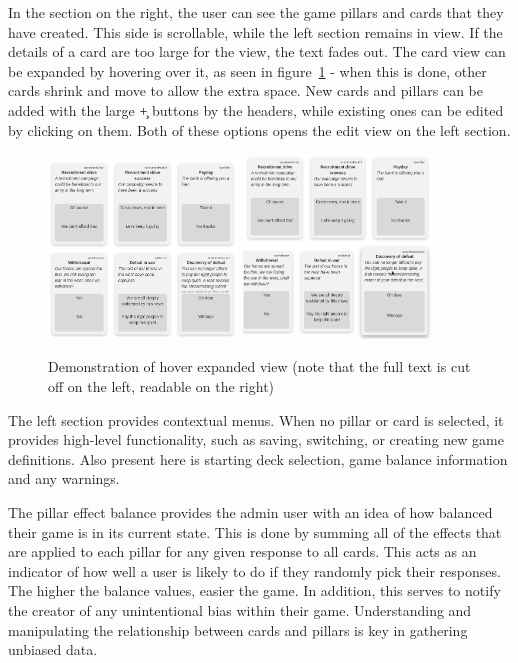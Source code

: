 In the section on the right, the user can see the game pillars and cards that they have created. This side is scrollable, while the left section remains in view. If the details of a card are too large for the view, the text fades out. The card view can be expanded by hovering over it, as seen in figure~\ref{fig:expand} - when this is done, other cards shrink and move to allow the extra space. New cards and pillars can be added with the large \c{+} buttons by the headers, while existing ones can be edited by clicking on them. Both of these options opens the edit view on the left section.

\begin{figure}[!h]
	\centering
	\includegraphics[width=0.45\textwidth]{./images/design/cards_not_expanded.png}
	\includegraphics[width=0.45\textwidth]{./images/design/cards_expanded.png}
	\caption{Demonstration of hover expanded view (note that the full text is cut off on the left, readable on the right)}
	\label{fig:expand}
\end{figure}

The left section provides contextual menus. When no pillar or card is selected, it provides high-level functionality, such as saving, switching, or creating new game definitions. Also present here is starting deck selection, game balance information and any warnings.

The pillar effect balance provides the admin user with an idea of how balanced their game is in its current state. This is done by summing all of the effects that are applied to each pillar for any given response to all cards. This acts as an indicator of how well a user is likely to do if they randomly pick their responses. The higher the balance values, easier the game. In addition, this serves to notify the creator of any unintentional bias within their game. Understanding and manipulating the relationship between cards and pillars is key in gathering unbiased data.

